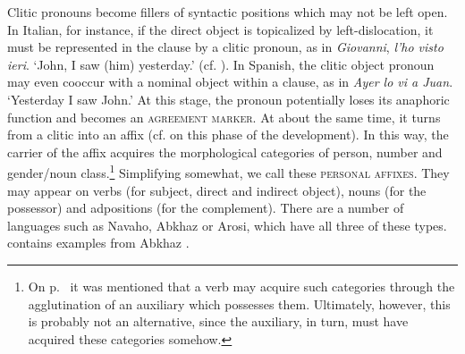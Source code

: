 Clitic pronouns become fillers of syntactic positions which may not be left open. In Italian, for instance, if the direct object is topicalized by left-dislocation, it must be represented in the clause by a clitic pronoun, as in \textit{Giovanni}, \textit{l'ho visto ieri}. ‘John, I saw (him) yesterday.’ (cf. \citealt[154]{MallinsonEtAl1981}). In Spanish, the clitic object pronoun may even cooccur with a nominal object within a clause, as in \textit{Ayer lo vi a Juan}. ‘Yesterday I saw John.’\label{page44} At this stage, the pronoun potentially loses its anaphoric function and becomes an \textsc{agreement marker}. At about the same time, it turns from a clitic into an affix (cf. \citealt[496f]{Humboldt1836} on this phase of the development). In this way, the carrier of the affix acquires the morphological categories of person, number and gender/noun class.\footnote{On p.~\pageref{page31}\chkfn%
it was mentioned that a verb may acquire such categories through the agglutination of an auxiliary which possesses them. Ultimately, however, this is probably not an alternative, since the auxiliary, in turn, must have acquired these categories somehow.} Simplifying somewhat, we call these \textsc{personal affixes}. They may appear on verbs (for subject, direct and indirect object), nouns (for the possessor) and adpositions (for the complement). There are a number of languages such as Navaho, Abkhaz or Arosi, which have all three of these types.  contains examples from Abkhaz \citep[105, 116, 103]{Hewitt1979}.

